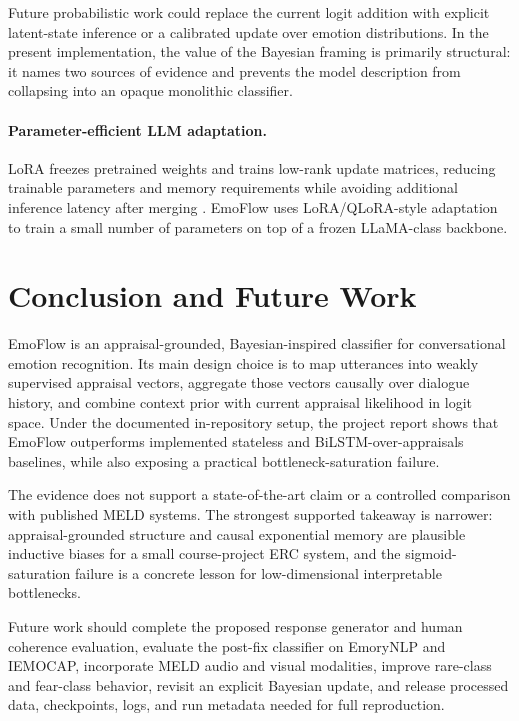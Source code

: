 \documentclass[11pt]{article}
\begin{document}
Future probabilistic work could replace the current logit addition with explicit latent-state inference or a calibrated update over emotion distributions. In the present implementation, the value of the Bayesian framing is primarily structural: it names two sources of evidence and prevents the model description from collapsing into an opaque monolithic classifier.

\paragraph{Parameter-efficient LLM adaptation.}
LoRA freezes pretrained weights and trains low-rank update matrices, reducing trainable parameters and memory requirements while avoiding additional inference latency after merging \citep{hu2021lora}. EmoFlow uses LoRA/QLoRA-style adaptation to train a small number of parameters on top of a frozen LLaMA-class backbone.

\section{Conclusion and Future Work}

EmoFlow is an appraisal-grounded, Bayesian-inspired classifier for conversational emotion recognition. Its main design choice is to map utterances into weakly supervised appraisal vectors, aggregate those vectors causally over dialogue history, and combine context prior with current appraisal likelihood in logit space. Under the documented in-repository setup, the project report shows that EmoFlow outperforms implemented stateless and BiLSTM-over-appraisals baselines, while also exposing a practical bottleneck-saturation failure.

The evidence does not support a state-of-the-art claim or a controlled comparison with published MELD systems. The strongest supported takeaway is narrower: appraisal-grounded structure and causal exponential memory are plausible inductive biases for a small course-project ERC system, and the sigmoid-saturation failure is a concrete lesson for low-dimensional interpretable bottlenecks.

Future work should complete the proposed response generator and human coherence evaluation, evaluate the post-fix classifier on EmoryNLP and IEMOCAP, incorporate MELD audio and visual modalities, improve rare-class and fear-class behavior, revisit an explicit Bayesian update, and release processed data, checkpoints, logs, and run metadata needed for full reproduction.



\end{document}
